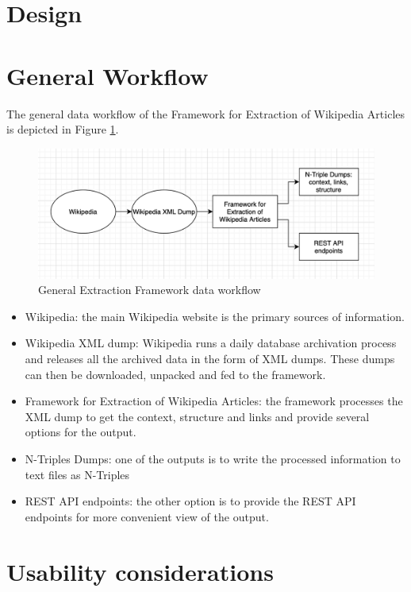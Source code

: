 \documentclass[thesis=M,english,hidelinks]{FITthesis}[2019/12/23]
\begin{document}
\section{Design}

\section{General Workflow}

The general data workflow of the Framework for Extraction of Wikipedia Articles is depicted in Figure \ref{fig:general-architecture}.

\begin{figure}
	\centering
	\includegraphics[width=1.0\linewidth]{general_architecture}
	\caption{General Extraction Framework data workflow}
	\label{fig:general-architecture}
\end{figure}

\begin{itemize}
	\item Wikipedia: the main Wikipedia website is the primary sources of information.
	\item Wikipedia XML dump: Wikipedia runs a daily database archivation process and releases all the archived data in the form of XML dumps. These dumps can then be downloaded, unpacked and fed to the framework.
	\item Framework for Extraction of Wikipedia Articles:  the framework processes the XML dump to get the context, structure and links and provide several options for the output.
	\item N-Triples Dumps: one of the outputs is to write the processed information to text files as N-Triples
	\item REST API endpoints: the other option is to provide the REST API endpoints for more convenient view of the output.
\end{itemize}


\section{Usability considerations}\label{usability_considerations}
\end{document}
